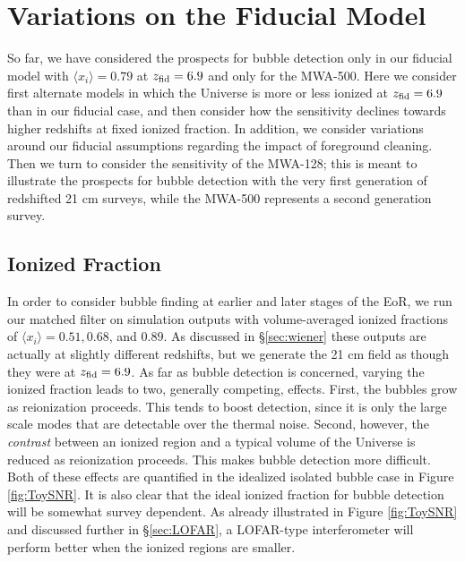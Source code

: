 \section{Variations on the Fiducial Model} \label{sec:Variations}

So far, we have considered the prospects for bubble detection only
in our fiducial model with $\langle x_i \rangle = 0.79$ at $z_{\rm fid} = 6.9$ and
only for the MWA-500. Here we consider first alternate models in
which the Universe is more or less ionized at $z_{\rm fid} = 6.9$ than in our
fiducial case, and then consider how the sensitivity declines towards
higher redshifts at fixed ionized fraction. In addition, we consider variations
around our fiducial assumptions regarding the impact of foreground cleaning.
Then we turn to consider
the sensitivity of the MWA-128; this is meant to illustrate the
prospects for bubble detection with the very first generation of redshifted
21 cm surveys, while the MWA-500 represents a second generation survey.



\subsection{Ionized Fraction} \label{sec:VaryXi}

In order to consider bubble finding at earlier and later stages of the
EoR, we run our matched filter on simulation outputs with volume-averaged 
ionized fractions of $\langle x_i \rangle = 0.51, 0.68$, and $0.89$. As discussed in
\S\ref{sec:wiener} these outputs are actually at slightly different redshifts,
but we generate the 21 cm field as though they were at $z_{\rm fid} = 6.9$.
As far as bubble detection is concerned, varying the ionized fraction leads
to two, generally competing, effects. First, the bubbles grow as reionization
proceeds. This tends to boost detection, since it is only the large
scale modes that are detectable over the thermal noise. Second, however,
the {\em contrast} between an ionized region and a typical volume
of the Universe is reduced as reionization proceeds. This makes bubble
detection more difficult. Both of these effects are quantified in
the idealized isolated bubble case in Figure \ref{fig:ToySNR}.
It is also clear that the ideal ionized fraction for bubble detection
will be somewhat survey dependent. As already illustrated in
Figure \ref{fig:ToySNR} and discussed further in \S \ref{sec:LOFAR},
a LOFAR-type interferometer will perform better when the ionized
regions are smaller. 

